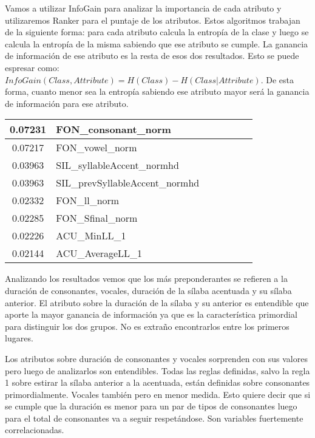 Vamos a utilizar InfoGain para analizar la importancia de cada atributo y utilizaremos Ranker para el puntaje de los atributos. Estos algoritmos trabajan de la siguiente forma: para cada atributo calcula la entropía de la clase y luego se calcula la entropía de la misma sabiendo que ese atributo se cumple. La ganancia de información de ese atributo es la resta de esos dos resultados. Esto se puede espresar como: $InfoGain(Class,Attribute) = H(Class) - H(Class | Attribute)$. De esta forma, cuanto menor sea la entropía sabiendo ese atributo mayor será la ganancia de información para ese atributo.

\begin{table}[H]
\centering
\begin{tabular}{|c|l|c|c|c|c|c|}
\hline
 0.07231     & FON\_consonant\_norm \\ \hline
 0.07217     & FON\_vowel\_norm \\ \hline
 0.03963     & SIL\_syllableAccent\_normhd \\ \hline
 0.03963     & SIL\_prevSyllableAccent\_normhd \\ \hline
 0.02332     & FON\_ll\_norm \\ \hline
 0.02285     & FON\_Sfinal\_norm \\ \hline
 0.02226     & ACU\_MinLL\_1 \\ \hline
 0.02144     & ACU\_AverageLL\_1 \\ \hline
 
\end{tabular}
\end{table}

Analizando los resultados vemos que los más preponderantes se refieren a la duración de consonantes, vocales, duración de la sílaba acentuada y su sílaba anterior. El atributo sobre la duración de la sílaba y su anterior es entendible que aporte la mayor ganancia de información ya que es la característica primordial para distinguir los dos grupos. No es extraño encontrarlos entre los primeros lugares. 

Los atributos sobre duración de consonantes y vocales sorprenden con sus valores pero luego de analizarlos son entendibles. Todas las reglas definidas, salvo la regla 1 sobre estirar la sílaba anterior a la acentuada, están definidas sobre consonantes primordialmente. Vocales también pero en menor medida. Esto quiere decir que si se cumple que la duración es menor para un par de tipos de consonantes luego para el total de consonantes va a seguir respetándose. Son variables fuertemente correlacionadas. 

